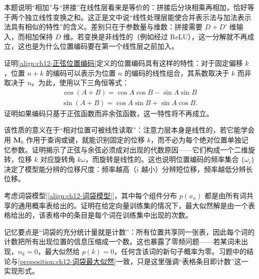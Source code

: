 \documentclass[../../main.tex]{subfiles}
\begin{document}
\begin{remark}
本题说明“相加”与“拼接”在线性层看来是等价的：拼接后分块相乘再相加，恰好等于两个独立线性变换之和。这正是文中说“线性处理层能使合并表示法与加法表示法具有相似的特性”的含义。差别只在于参数量与维数：拼接需要 $D+D'$ 维输入，而相加保持 $D$ 维。若变换是非线性的（例如经过 ReLU），这一分解就不再成立，这也是为什么位置编码要在第一个线性层之前加入。
\end{remark}

\begin{exercise}\label{exercise:ch12-10}
证明\eqref{align:ch12-正弦位置编码}定义的位置编码具有这样的特性：对于固定偏移 $k$，位置 $n+k$ 的编码可以表示为位置 $n$ 的编码的线性组合，其系数取决于 $k$ 而非取决于 $n$。为此，使用以下三角恒等式：
\begin{align}
\cos(A+B)=\cos A\cos B-\sin A\sin B
\label{align:ch12-余弦和角}
\end{align}
\begin{align}
\sin(A+B)=\cos A\sin B+\sin A\cos B.
\label{align:ch12-正弦和角}
\end{align}
证明如果编码只基于正弦函数而非余弦函数，这一特性将不再成立。
\end{exercise}

\begin{remark}
该性质的意义在于“相对位置可被线性读取”：注意力层本身是线性的，若它能学会用 $\mathbf{M}_k$ 作用于查询或键，就能识别固定的位移 $k$，而不必为每个绝对位置单独记忆参数。证明揭示了正弦与余弦必须成对出现的代数原因——它们构成一个二维旋转，位移 $k$ 对应旋转角 $k\omega$，而旋转是线性的。这也说明位置编码的频率集合 $\{\omega_i\}$ 决定了模型能分辨的位移尺度：频率越高（$i$ 越小）分辨短位移，频率越低分辨长位移。
\end{remark}

\begin{exercise}[（$\star$）]\label{exercise:ch12-11}
考虑词袋模型[\eqref{align:ch12-词袋模型}]，其中每个组件分布 $p(x_n)$ 都是由所有词共享的通用概率表给出的。证明在给定向量训练集的情况下，最大似然解是由一个表格给出的，该表格中的条目是每个词在训练集中出现的次数。
\end{exercise}

\begin{remark}
记忆要点是“词袋的充分统计量就是计数”：所有位置共享同一张表，因此每个词的计数把所有出现位置的信息压缩成一个数。这也暴露了零频问题——若某词未出现，$n_k=0$，最大似然给 $p(k)=0$，任何含该词的新句子概率为零。习题中的结论与\cref{proposition:ch12-词袋最大似然}一致，只是这里强调“表格条目即计数”这一实现形式。
\end{remark}
\end{document}
